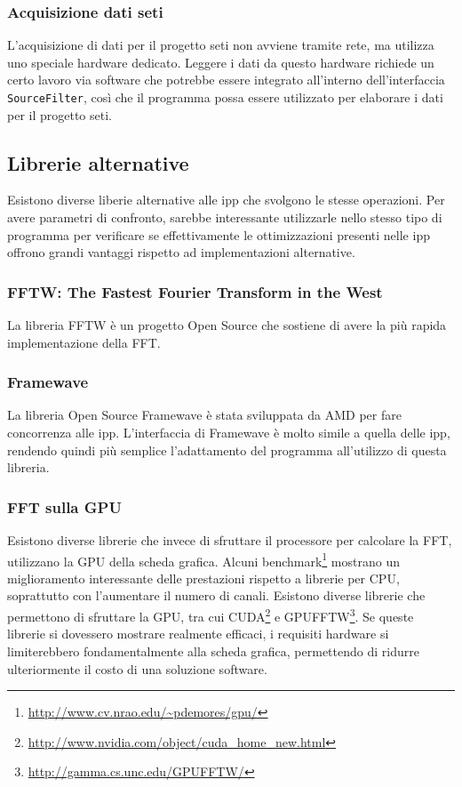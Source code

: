 \subsubsection{Acquisizione dati \ac{seti}}
\label{seti}
L'acquisizione di dati per il progetto \ac{seti} non avviene tramite rete, ma
utilizza uno speciale hardware dedicato. Leggere i dati da questo hardware
richiede un certo lavoro via software che potrebbe essere integrato all'interno
dell'interfaccia \texttt{SourceFilter}, cos\`i che il programma possa essere
utilizzato per elaborare i dati per il progetto \ac{seti}.

\subsection{Librerie alternative}
\label{altlib}

Esistono diverse liberie alternative alle \ac{ipp} che svolgono le stesse
operazioni. Per avere parametri di confronto, sarebbe interessante utilizzarle
nello stesso tipo di programma per verificare se effettivamente le
ottimizzazioni presenti nelle \ac{ipp} offrono grandi vantaggi rispetto ad
implementazioni alternative.

\subsubsection{FFTW: The Fastest Fourier Transform in the West}
La libreria FFTW \`e un progetto Open Source che sostiene di avere la pi\`u
rapida implementazione della \ac{FFT}.

\subsubsection{Framewave}
La libreria Open Source Framewave \`e stata sviluppata da AMD per fare
concorrenza alle \ac{ipp}. L'interfaccia di Framewave \`e molto simile a quella
delle \ac{ipp}, rendendo quindi pi\`u semplice l'adattamento del programma
all'utilizzo di questa libreria.

\subsubsection{\ac{FFT} sulla GPU}
Esistono diverse librerie che invece di sfruttare il processore per calcolare la
\ac{FFT}, utilizzano la GPU della scheda grafica. Alcuni
benchmark\footnote{\url{http://www.cv.nrao.edu/~pdemores/gpu/}} mostrano un
miglioramento interessante delle prestazioni rispetto a librerie per CPU,
soprattutto con l'aumentare il numero di canali. Esistono diverse librerie che
permettono di sfruttare la GPU, tra cui
CUDA\footnote{\url{http://www.nvidia.com/object/cuda_home_new.html}} e
GPUFFTW\footnote{\url{http://gamma.cs.unc.edu/GPUFFTW/}}. Se queste librerie si
dovessero mostrare realmente efficaci, i requisiti hardware si limiterebbero
fondamentalmente alla scheda grafica, permettendo di ridurre ulteriormente il
costo di una soluzione software.

